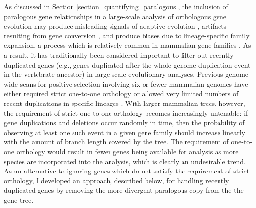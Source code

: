 As discussed in Section \ref{section_quantifying_paralogous}, the
inclusion of paralogous gene relationships in a large-scale analysis
of orthologous gene evolution may produce misleading signals of
adaptive evolution \citep{Lynch2000}, artifacts resulting from gene
conversion \citep{Casola2009}, and produce biases due to lineage-specific
family expansion, a process which is relatively common in mammalian
gene families \citep{Gu2002}. As a result, it has traditionally been
considered important to filter out recently-duplicated genes (e.g.,
genes duplicated after the whole-genome duplication event in the
vertebrate ancestor) in large-scale evolutionary analyses. Previous
genome-wide scans for positive selection involving six or fewer
mammalian genomes have either required strict one-to-one orthology
\citep{Clark2003,Nielsen2005} or allowed very limited numbers of
recent duplications in specific lineages \citep{Kosiol2008}. With
larger mammalian trees, however, the requirement of strict one-to-one
orthology becomes increasingly untenable: if gene duplications and
deletions occur randomly in time, then the probability of observing at
least one such event in a given gene family should increase linearly
with the amount of branch length covered by the tree. The requirement
of one-to-one orthology would result in fewer genes being available
for analysis as more species are incorporated into the analysis, which
is clearly an undesirable trend. As an alternative to ignoring genes
which do not satisfy the requirement of strict orthology, I developed
an approach, described below, for handling recently duplicated genes
by removing the more-divergent paralogous copy from the the gene tree.

